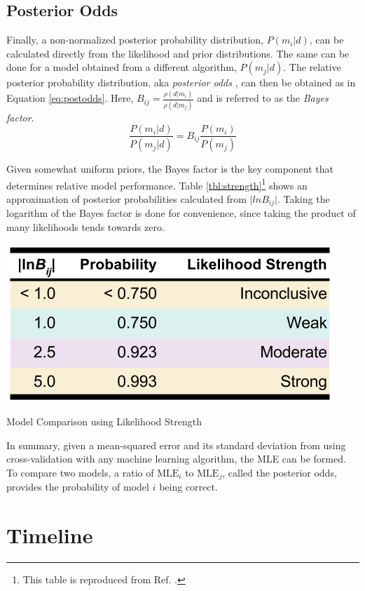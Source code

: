 \subsection{Posterior Odds}

Finally, a non-normalized posterior probability distribution, $P(m_i|d)$, can
be calculated directly from the likelihood and prior distributions. The same
can be done for a model obtained from a different algorithm, $P(m_j|d)$. The
relative posterior probability distribution, aka \textit{posterior odds}
\cite{bayes_compare}, can then be obtained as in Equation \ref{eq:postodds}.
Here, $B_{ij} = \frac{\rho(d|m_i)}{\rho(d|m_j)}$ and is referred to as the
\textit{Bayes factor}.
\begin{equation}
\label{eq:postodds}
  \frac{P(m_i|d)}{P(m_j|d)} = B_{ij} \frac{P(m_i)}{P(m_j)}
\end{equation}

Given somewhat uniform priors, the Bayes factor is the key component that
determines relative model performance. Table \ref{tbl:strength}\footnote{This
table is reproduced from Ref. \cite{bayes_compare}.} shows an approximation of
posterior probabilities calculated from $\lvert lnB_{ij} \rvert$. Taking the
logarithm of the Bayes factor is done for convenience, since taking the product
of many likelihoods tends towards zero.

\begin{table}[!hbt]
  \centering
  \includegraphics[width=0.7\linewidth]{./chapters/proposal/evidence-strength.png}
  \caption{Model Comparison using Likelihood Strength}
  \label{tbl:strength}
\end{table}

In summary, given a mean-squared error and its standard deviation from using cross-validation 
with any machine learning algorithm, the \gls{MLE} can be formed. To compare two models, a ratio of $\text{MLE}_i$ to $\text{MLE}_j$,
called the posterior odds, provides the probability of model $i$ being correct.


\section{Timeline}
\label{sec:timeline}

